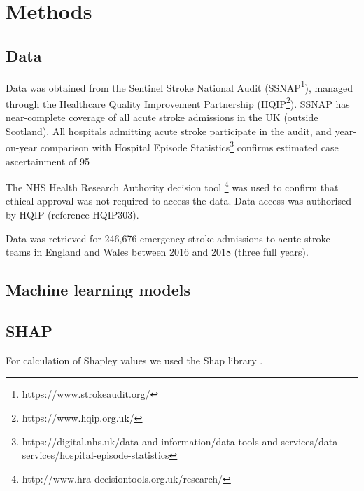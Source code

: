 \section{Methods}

\subsection{Data}

Data was obtained from the Sentinel Stroke National Audit (SSNAP\footnote{https://www.strokeaudit.org/}), managed through the Healthcare Quality Improvement Partnership (HQIP\footnote{https://www.hqip.org.uk/}). SSNAP has near-complete coverage of all acute stroke admissions in the UK (outside Scotland). All hospitals admitting acute stroke participate in the audit, and year-on-year comparison with Hospital Episode Statistics\footnote{https://digital.nhs.uk/data-and-information/data-tools-and-services/data-services/hospital-episode-statistics} confirms estimated case ascertainment of 95%

The NHS Health Research Authority decision tool \footnote{http://www.hra-decisiontools.org.uk/research/} was used to confirm that ethical approval was not required to access the data. Data access was authorised by HQIP (reference HQIP303).

Data was retrieved for 246,676 emergency stroke admissions to acute stroke teams in England and Wales between 2016 and 2018 (three full years).


\subsection{Machine learning models}

\subsection{SHAP}

For calculation of Shapley values we used the Shap library \cite{lundberg_unified_2017}.